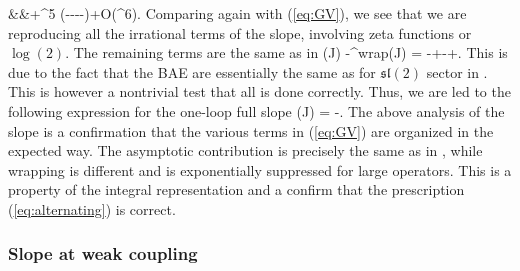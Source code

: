 &&+^5
   \left(----\right)+O\left(^6\right).
\ea
Comparing again with (\ref{eq:GV}), we see that we are reproducing all the irrational terms of the slope, involving zeta functions or $\log(2)$. The remaining terms 
are the same as in \ads
\beq
\sigma(\mc J) -\sigma^{\rm wrap}(\mc J) = -+-+\cdots.
\eeq
This is due to the fact that the BAE are essentially the same as for $\mathfrak{sl}(2)$ sector in \ads. 
This is however a nontrivial test that all is done correctly.
Thus, we are led to the following expression for the one-loop full slope 
\beq
\sigma(\mc J) = -\left[\frac{1}{\mc J^{2}+1}+\sum_{n=-\infty}^{\infty}\frac{(-1)^{n}}{
\sqrt{\mc J^{4}+(n^{2}+1)\,\mc J^{2}+n^{2}}}
\right].
\eeq
The above analysis of the slope is a confirmation  that the various terms in (\ref{eq:GV}) are organized in the expected way. The asymptotic contribution is precisely the same as in \ads, while wrapping is different and is exponentially
suppressed for large operators. This is a property of the integral representation and a confirm that the 
prescription (\ref{eq:alternating}) is correct.

\subsubsection{Slope at weak coupling}

